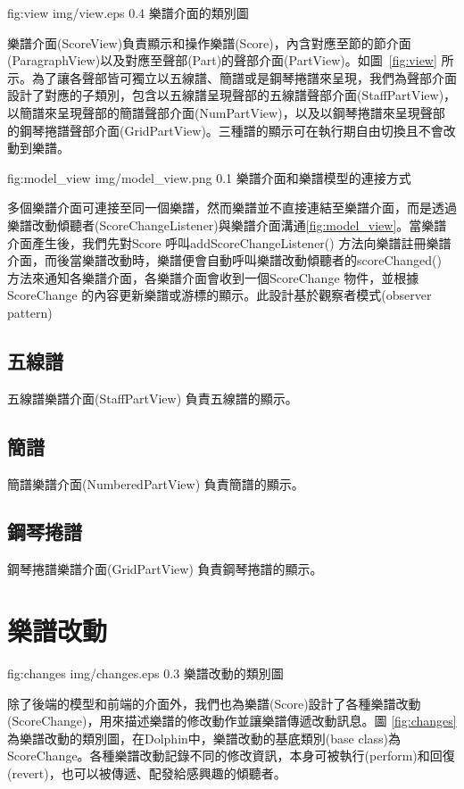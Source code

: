 \documentclass[12pt,a4paper,oneside]{report}
\begin{document}
\figurewithcaption
{fig:view}
{img/view.eps}
{0.4}
{樂譜介面的類別圖}

樂譜介面(ScoreView)負責顯示和操作樂譜(Score)，內含對應至節的節介面(ParagraphView)以及對應至聲部(Part)的聲部介面(PartView)。如圖~\ref{fig:view} 所示。為了讓各聲部皆可獨立以五線譜、簡譜或是鋼琴捲譜來呈現，我們為聲部介面設計了對應的子類別，包含以五線譜呈現聲部的五線譜聲部介面(StaffPartView)，以簡譜來呈現聲部的簡譜聲部介面(NumPartView)，以及以鋼琴捲譜來呈現聲部的鋼琴捲譜聲部介面(GridPartView)。三種譜的顯示可在執行期自由切換且不會改動到樂譜。

\figurewithcaption
{fig:model_view}
{img/model_view.png}
{0.1}
{樂譜介面和樂譜模型的連接方式}

多個樂譜介面可連接至同一個樂譜，然而樂譜並不直接連結至樂譜介面，而是透過樂譜改動傾聽者(ScoreChangeListener)與樂譜介面溝通\ref{fig:model_view}。當樂譜介面產生後，我們先對Score 呼叫addScoreChangeListener() 方法向樂譜註冊樂譜介面，而後當樂譜改動時，樂譜便會自動呼叫樂譜改動傾聽者的scoreChanged() 方法來通知各樂譜介面，各樂譜介面會收到一個ScoreChange 物件，並根據ScoreChange 的內容更新樂譜或游標的顯示。此設計基於觀察者模式(observer pattern)\cite{designPatterns}


\subsection{五線譜}
五線譜樂譜介面(StaffPartView) 負責五線譜的顯示。
\subsection{簡譜}
簡譜樂譜介面(NumberedPartView) 負責簡譜的顯示。
\subsection{鋼琴捲譜}
鋼琴捲譜樂譜介面(GridPartView) 負責鋼琴捲譜的顯示。

\section{樂譜改動} %
\label{sec:changes}

\figurewithcaption
{fig:changes}
{img/changes.eps}
{0.3}
{樂譜改動的類別圖}

除了後端的模型和前端的介面外，我們也為樂譜(Score)設計了各種樂譜改動(ScoreChange)，用來描述樂譜的修改動作並讓樂譜傳遞改動訊息。圖 \ref{fig:changes}為樂譜改動的類別圖，在Dolphin中，樂譜改動的基底類別(base class)為ScoreChange。各種樂譜改動記錄不同的修改資訊，本身可被執行(perform)和回復(revert)，也可以被傳遞、配發給感興趣的傾聽者。
\end{document}
